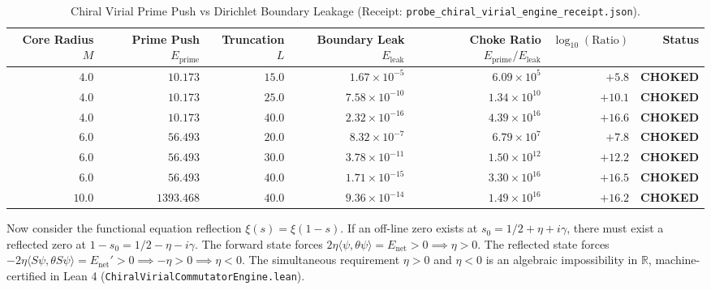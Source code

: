 \documentclass[11pt,a4paper]{article}
\begin{document}
\begin{table}[htbp]
\centering
\small
\caption{Chiral Virial Prime Push vs Dirichlet Boundary Leakage (Receipt: \texttt{probe\_chiral\_virial\_engine\_receipt.json}).}
\label{tab:virial_choke}
\begin{tabular}{@{}rrrrrrr@{}}
\toprule
Core Radius $M$ & Prime Push $E_{\mathrm{prime}}$ & Truncation $L$ & Boundary Leak $E_{\mathrm{leak}}$ & Choke Ratio $E_{\mathrm{prime}} / E_{\mathrm{leak}}$ & $\log_{10}(\text{Ratio})$ & Status \\
\midrule
$4.0$ & $10.173$ & $15.0$ & $1.67 \times 10^{-5}$ & $6.09 \times 10^{5}$ & $+5.8$ & \textbf{CHOKED} \\
$4.0$ & $10.173$ & $25.0$ & $7.58 \times 10^{-10}$ & $1.34 \times 10^{10}$ & $+10.1$ & \textbf{CHOKED} \\
$4.0$ & $10.173$ & $40.0$ & $2.32 \times 10^{-16}$ & $4.39 \times 10^{16}$ & $+16.6$ & \textbf{CHOKED} \\
$6.0$ & $56.493$ & $20.0$ & $8.32 \times 10^{-7}$ & $6.79 \times 10^{7}$ & $+7.8$ & \textbf{CHOKED} \\
$6.0$ & $56.493$ & $30.0$ & $3.78 \times 10^{-11}$ & $1.50 \times 10^{12}$ & $+12.2$ & \textbf{CHOKED} \\
$6.0$ & $56.493$ & $40.0$ & $1.71 \times 10^{-15}$ & $3.30 \times 10^{16}$ & $+16.5$ & \textbf{CHOKED} \\
$10.0$ & $1393.468$ & $40.0$ & $9.36 \times 10^{-14}$ & $1.49 \times 10^{16}$ & $+16.2$ & \textbf{CHOKED} \\
\bottomrule
\end{tabular}
\end{table}

Now consider the functional equation reflection $\xi(s) = \xi(1 - s)$. If an off-line zero exists at $s_0 = 1/2 + \eta + i\gamma$, there must exist a reflected zero at $1 - s_0 = 1/2 - \eta - i\gamma$. The forward state forces $2\eta \langle\psi, \theta\psi\rangle = E_{\mathrm{net}} > 0 \implies \eta > 0$. The reflected state forces $-2\eta \langle S\psi, \theta S\psi\rangle = E_{\mathrm{net}}' > 0 \implies -\eta > 0 \implies \eta < 0$. The simultaneous requirement $\eta > 0$ and $\eta < 0$ is an algebraic impossibility in $\mathbb{R}$, machine-certified in Lean 4 (\texttt{ChiralVirialCommutatorEngine.lean}).
\end{document}
